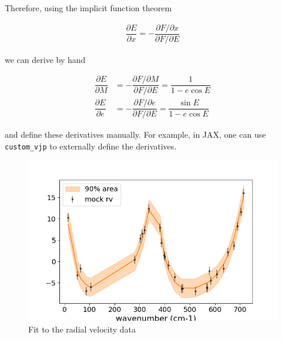 Therefore, using the implicit function theorem

\begin{align}
    \dfrac{\partial E}{\partial x} = - \dfrac{ \partial F/ \partial x }{\partial F / \partial E}
\end{align}

we can derive by hand

\begin{align}
\dfrac{\partial E}{\partial M} &= - \dfrac{ \partial F/ \partial M }{\partial F / \partial E} = \dfrac{1}{1 - e \cos{E}} \\
\dfrac{\partial E}{\partial e} &= - \dfrac{ \partial F/ \partial e }{\partial F / \partial E} = \dfrac{\sin{E}}{1 - e \cos{E}}
\end{align}

and define these derivatives manually.  
For example, in JAX, one can use \texttt{custom\_vjp} to externally define the derivatives.

\begin{figure}
    \centering
    \includegraphics[width=\linewidth]{fig/rv_fit.png}
    \caption{Fit to the radial velocity data}
    \label{fig:rvfit}
\end{figure}
